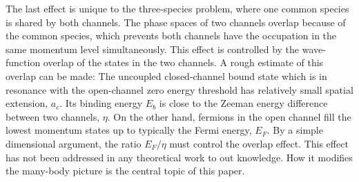 \documentclass[reprint,pra]{revtex4-1}
\providecommand{\abs}[1]{\ensuremath{\left\lvert{#1}\right\rvert}}
\begin{document}
The last effect is unique to the three-species problem, where one common species is shared by both channels.  The phase spaces of two channels overlap because of  the common species, which prevents both channels have the occupation in the same momentum level simultaneously. This effect is controlled by the wave-function overlap of the states in the two channels. A rough estimate of this overlap can be made: The uncoupled closed-channel bound state which is in resonance with the open-channel zero energy threshold has  relatively small  spatial extension, $a_c$.  Its binding energy $E_b$ is close to the Zeeman energy difference between two channels, $\eta$.  On the other hand, fermions in the open channel fill the lowest  momentum states up to typically the Fermi energy, $E_F$.  By a simple dimensional argument, the ratio $E_F/\eta$ must control the overlap effect. This effect has  not been addressed in any theoretical work to out knowledge.  How it modifies the many-body picture is the central topic of this paper. 

\end{document}
